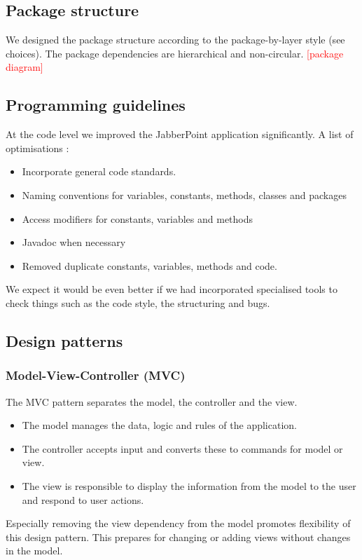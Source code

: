 \documentclass[a4paper]{article}
\newcommand{\todo}[1]{\textcolor{red}{[#1]}}
\begin{document}
\subsection{Package structure}
We designed the package structure according to the package-by-layer style (see choices).
The package dependencies are hierarchical and non-circular. 
\todo{package diagram}


\subsection{Programming guidelines}
At the code level we improved the JabberPoint application significantly.
A list of optimisations :
\begin{itemize} 
\item Incorporate general code standards.
\item Naming conventions for variables, constants, methods, classes and packages
\item Access modifiers for constants, variables and methods 
\item Javadoc when necessary
\item Removed duplicate constants, variables, methods and code.
\end{itemize} 
We expect it would be even better if we had incorporated specialised tools to check things such as the code style, the structuring and bugs. 

\subsection{Design patterns}
\subsubsection{Model-View-Controller (MVC)}
The MVC pattern separates the model, the controller and the view.   
\begin{itemize}
\item The model manages the data, logic and rules of the application.
\item The controller accepts input and converts these to commands for model or view.
\item The view is responsible to display the information from the model to the user and respond to user actions.   
\end{itemize}
Especially removing the view dependency from the model promotes flexibility of this design pattern. This prepares for changing or adding views without changes in the model.
\end{document}

